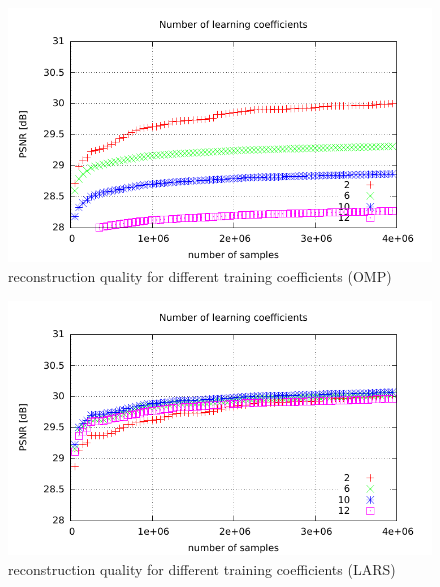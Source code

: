 \newpage
\begin{figure}[H]
\centering
\includegraphics[width =
1.0\textwidth]{../tests/results/coeffsConvergOMP.pdf}
\caption{reconstruction quality for different training coefficients (OMP)}
\label{fig:coeffsOMP}
\end{figure}

\begin{figure}[H]
\centering
\includegraphics[width = 1.0\textwidth]{../tests/results/coeffsConverg.pdf}
\caption{reconstruction quality for different training coefficients (LARS)}
\label{fig:coeffsLasso}
\end{figure}



